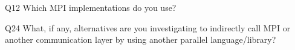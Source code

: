 \begin{description}%
\item{Q12} Which MPI implementations do you use?%
\item{Q24} What, if any, alternatives are you investigating to indirectly call MPI or another communication layer by using another parallel language/library?%
\end{description}%
